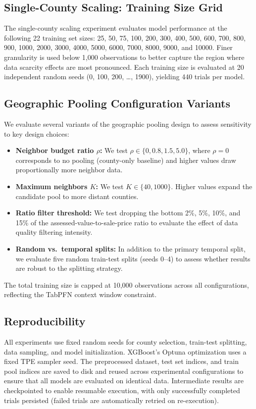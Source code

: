 \subsection{Single-County Scaling: Training Size Grid}\label{app:scaling_grid}

The single-county scaling experiment evaluates model performance at the following 22 training set sizes: 25, 50, 75, 100, 200, 300, 400, 500, 600, 700, 800, 900, 1000, 2000, 3000, 4000, 5000, 6000, 7000, 8000, 9000, and 10000. Finer granularity is used below 1,000 observations to better capture the region where data scarcity effects are most pronounced. Each training size is evaluated at 20 independent random seeds (0, 100, 200, \ldots, 1900), yielding 440 trials per model.

\subsection{Geographic Pooling Configuration Variants}\label{app:geo_variants}

We evaluate several variants of the geographic pooling design to assess sensitivity to key design choices:

\begin{itemize}
    \item \textbf{Neighbor budget ratio $\rho$:} We test $\rho \in \{0, 0.8, 1.5, 5.0\}$, where $\rho = 0$ corresponds to no pooling (county-only baseline) and higher values draw proportionally more neighbor data.
    \item \textbf{Maximum neighbors $K$:} We test $K \in \{40, 1000\}$. Higher values expand the candidate pool to more distant counties.
    \item \textbf{Ratio filter threshold:} We test dropping the bottom 2\%, 5\%, 10\%, and 15\% of the assessed-value-to-sale-price ratio to evaluate the effect of data quality filtering intensity.
    \item \textbf{Random vs.\ temporal splits:} In addition to the primary temporal split, we evaluate five random train-test splits (seeds 0--4) to assess whether results are robust to the splitting strategy.
\end{itemize}

The total training size is capped at 10,000 observations across all configurations, reflecting the TabPFN context window constraint.

\subsection{Reproducibility}\label{app:reproducibility}

All experiments use fixed random seeds for county selection, train-test splitting, data sampling, and model initialization. XGBoost's Optuna optimization uses a fixed TPE sampler seed. The preprocessed dataset, test set indices, and train pool indices are saved to disk and reused across experimental configurations to ensure that all models are evaluated on identical data. Intermediate results are checkpointed to enable resumable execution, with only successfully completed trials persisted (failed trials are automatically retried on re-execution).
